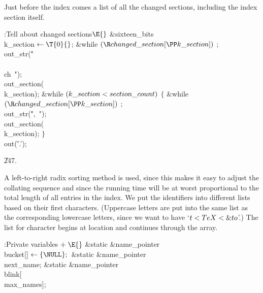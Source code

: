 Just before the index comes a list of all the changed sections,
including
the index section itself.

\Y\B\4:Tell about changed sections\X${}\E{}$\6
\&{sixteen\_bits} \\{k\_section}${}\K\T{0}{}$;\7
\&{while} ${}(\R\\{changed\_section}[\PP\\{k\_section}]){}$\1\5
;\2\6
\\{out\_str}(\.{"\\\\ch\ "});\6
\\{out\_section}(\\{k\_section});\6
\&{while} ${}(\\{k\_section}<\\{section\_count}){}$\5
${}\{{}$\1\6
\&{while} ${}(\R\\{changed\_section}[\PP\\{k\_section}]){}$\1\5
;\2\6
\\{out\_str}(\.{",\ "});\6
\\{out\_section}(\\{k\_section});\6
\4${}\}{}$\2\6
\\{out}(\.{'.'});\par
\U247.\fi

A left-to-right radix sorting method is used, since this makes it easy
to
adjust the collating sequence and since the running time will be at worst
proportional to the total length of all entries in the index. We put the
identifiers into different lists based on their first characters.
(Uppercase letters are put into the same list as the corresponding lowercase
letters, since we want to have `$t<\\{TeX}<\&{to}$'.) The
list for character  begins at location  and
continues through
the  array.

\Y\B\4:Private variables\X${}\mathrel+\E{}$\6
\&{static} \&{name\_pointer} \\{bucket}[]${}\K\{\NULL\};{}$\6
\&{static} \&{name\_pointer} \\{next\_name};\6
\&{static} \&{name\_pointer} \\{blink}[\\{max\_names}];\par
\fi


